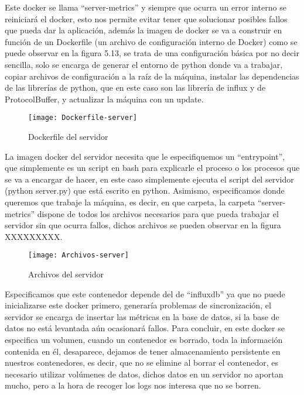 \documentclass[ spanish, a4paper, 12pt, oneside]{report}
\begin{document}
Este docker se llama ``server-metrics'' y siempre que ocurra un error interno se reiniciará el docker, esto nos permite evitar 
tener que solucionar posibles fallos que pueda dar la aplicación, además la imagen de docker se va a construir en función de un Dockerfile (un archivo de configuración interno de Docker) como se puede observar en la figura 5.13, se trata de una configuración básica 
por no decir sencilla, solo se encarga de generar el entorno de python donde va a trabajar, copiar archivos de configuración a la raíz de la máquina, instalar las dependencias de las librerías de python, que en este caso son las librería de influx y de ProtocolBuffer, y actualizar 
la máquina con un update. \\ 

\begin{figure}[!h]
   \centering
   \texttt{[image: Dockerfile-server]}\\
      \caption{\label{fig: Dockerfile del servidor} Dockerfile del servidor}
\end{figure}

La imagen docker del servidor necesita que le especifiquemos un ``entrypoint'', que simplemente es un script en bash para explicarle el proceso o los procesos que se va a encargar de hacer, en este caso simplemente ejecuta el script del servidor (python server.py) que está 
escrito en python. Asimismo, especificamos donde queremos que trabaje la máquina, es decir, en que carpeta, la carpeta ``server-metrics'' dispone de todos los archivos necesarios para que pueda trabajar el servidor sin que ocurra fallos, dichos archivos se pueden observar en la figura XXXXXXXXX.\\

\begin{figure}[!h]
   \centering
   \texttt{[image: Archivos-server]}\\
      \caption{\label{fig: Archivos del servidor} Archivos del servidor}
\end{figure}

Especificamos que este contenedor depende del de ``influxdb'' ya que no puede inicializarse este docker primero, generaría problemas de sincronización, el servidor se encarga de insertar las métricas en la base de datos, si la base de datos no está levantada aún ocasionará fallos. 
Para concluir, en este docker se especifica un volumen, cuando un contenedor es borrado, toda la información contenida en él, desaparece, dejamos de tener almacenamiento persistente en nuestros contenedores, es decir, que no se elimine al borrar el contenedor, es necesario utilizar volúmenes de datos, 
dichos datos en un servidor no aportan mucho, pero a la hora de recoger los logs nos interesa que no se borren.\\
\end{document}
